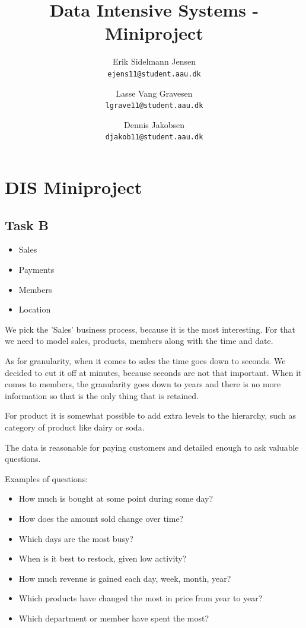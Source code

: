 

\author{
  Erik Sidelmann Jensen\\
  \texttt{ejens11@student.aau.dk}
  \and
  Lasse Vang Gravesen\\
  \texttt{lgrave11@student.aau.dk}
  \and
  Dennis Jakobsen\\
  \texttt{djakob11@student.aau.dk}  
}

\title{Data Intensive Systems - Miniproject}
\date{}


	\clearpage\maketitle
	\thispagestyle{empty}
	
	\chapter{DIS Miniproject}
	\section{Task B}
	\begin{itemize}
	\item Sales
	\item Payments
	\item Members
	\item Location
	\end{itemize}
	
	We pick the 'Sales' business process, because it is the most interesting. For that we need to model sales, products, members along with the time and date.
	
	As for granularity, when it comes to sales the time goes down to seconds. We decided to cut it off at minutes, because seconds are not that important. When it comes to members, the granularity goes down to years and there is no more information so that is the only thing that is retained. 
	
	For product it is somewhat possible to add extra levels to the hierarchy, such as category of product like dairy or soda.
	
	The data is reasonable for paying customers and detailed enough to ask valuable questions.
	
	Examples of questions:
	\begin{itemize}
	\item How much is bought at some point during some day?
	\item How does the amount sold change over time?
	\item Which days are the most busy?
	\item When is it best to restock, given low activity?
	\item How much revenue is gained each day, week, month, year?
	\item Which products have changed the most in price from year to year?
	\item Which department or member have spent the most?
	\end{itemize}


